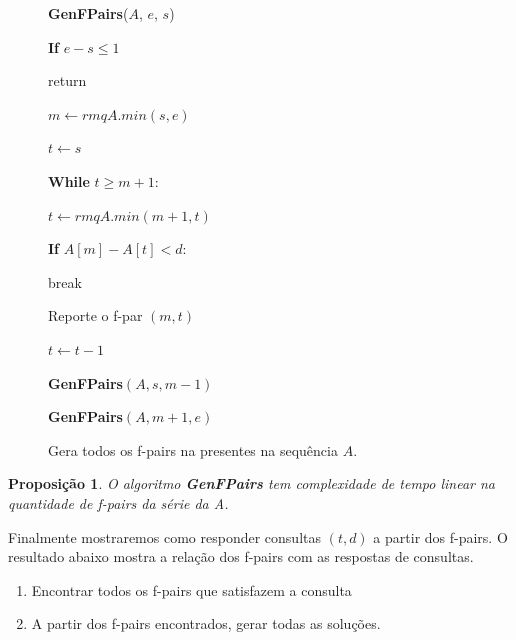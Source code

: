 \documentclass[12pt]{article}
\newtheorem{prop}[thm]{Proposição}
\begin{document}
\clearpage
\begin{figure}
\begin{framed}
{\bf GenFPairs}($A$, $e$, $s$)

\hspace{1cm} {\bf If} $e - s \le 1$

\hspace{2cm} return

\hspace{1cm} $m \leftarrow rmqA.min(s, e)$

\hspace{1cm} $t \leftarrow s$

\hspace{1cm} {\bf While} $t \ge m + 1$:

\hspace{2cm} $t \leftarrow rmqA.min(m + 1, t)$

\hspace{2cm} {\bf If} $A[m] - A[t] < d$:

\hspace{3cm} break

\hspace{2cm} Reporte o f-par $(m, t)$

\hspace{2cm} $t \leftarrow t - 1$

\hspace{1cm} {\bf GenFPairs}$(A, s, m - 1)$

\hspace{1cm} {\bf GenFPairs}$(A, m + 1, e)$

\end{framed}
\caption{Gera todos os f-pairs na presentes na sequência $A$.}
\label{gemfpair}
\end{figure}

\begin{prop}
O algoritmo {\bf GenFPairs} tem complexidade de tempo linear na quantidade
de f-pairs da série da A.
\end{prop}

Finalmente mostraremos como responder consultas $(t, d)$ a partir dos f-pairs.
O resultado abaixo mostra a relação dos f-pairs com as respostas de consultas.

\begin{enumerate}
\item Encontrar todos os f-pairs que satisfazem a consulta 
\item A partir dos f-pairs encontrados, gerar todas as soluções.
\end{enumerate}
\end{document}
